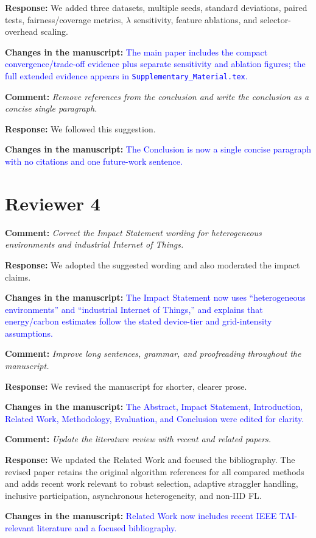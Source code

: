 \documentclass[11pt]{article}
\newcommand{\comment}[1]{\textbf{Comment:} \textit{#1}}
\newcommand{\response}[1]{\textbf{Response:} #1}
\newcommand{\change}[1]{\textbf{Changes in the manuscript:} \textcolor{blue}{#1}}
\begin{document}
\response{We added three datasets, multiple seeds, standard deviations, paired tests, fairness/coverage metrics, $\lambda$ sensitivity, feature ablations, and selector-overhead scaling.}

\change{The main paper includes the compact convergence/trade-off evidence plus separate sensitivity and ablation figures; the full extended evidence appears in \texttt{Supplementary\_Material.tex}.}

\comment{Remove references from the conclusion and write the conclusion as a concise single paragraph.}

\response{We followed this suggestion.}

\change{The Conclusion is now a single concise paragraph with no citations and one future-work sentence.}

\section*{Reviewer 4}

\comment{Correct the Impact Statement wording for heterogeneous environments and industrial Internet of Things.}

\response{We adopted the suggested wording and also moderated the impact claims.}

\change{The Impact Statement now uses ``heterogeneous environments'' and ``industrial Internet of Things,'' and explains that energy/carbon estimates follow the stated device-tier and grid-intensity assumptions.}

\comment{Improve long sentences, grammar, and proofreading throughout the manuscript.}

\response{We revised the manuscript for shorter, clearer prose.}

\change{The Abstract, Impact Statement, Introduction, Related Work, Methodology, Evaluation, and Conclusion were edited for clarity.}

\comment{Update the literature review with recent and related papers.}

\response{We updated the Related Work and focused the bibliography. The revised paper retains the original algorithm references for all compared methods and adds recent work relevant to robust selection, adaptive straggler handling, inclusive participation, asynchronous heterogeneity, and non-IID FL.}

\change{Related Work now includes recent IEEE TAI-relevant literature and a focused bibliography.}
\end{document}
